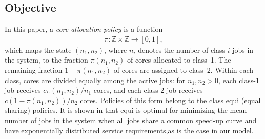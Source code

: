 \documentclass[11pt]{article}
\newcommand{\jp}[1]{\footnote{J-P: #1}}
\theoremstyle{remark}
\theoremstyle{definition}
\numberwithin{equation}{section}
\begin{document}
\subsection{Objective}
In this paper, a {\it core allocation policy} is a function
\begin{align*}
\pi: \mathbb{Z} \times \mathbb{Z} \to [0,1],
\end{align*}
which maps the state $(n_1,n_2)$, where $n_i$ denotes the number of class-$i$ jobs in the system, to the fraction $\pi(n_1,n_2)$ of cores allocated to class~1. The remaining fraction $1-\pi(n_1,n_2)$ of cores are assigned to class~2.
Within each class, cores are divided equally among the active jobs: for $n_1,n_2>0$, each class-1 job receives $c\pi(n_1,n_2)/n_1$ cores, and each class-2 job receives $c(1-\pi(n_1,n_2))/n_2$ cores. Policies of this form belong to the class {\sc equi} (equal sharing) policies.
It is shown in \cite{berg2017} that {\sc equi} is optimal for minimizing the mean number of jobs in the system when all jobs share a common speed-up curve and have exponentially distributed service requirements,{as is the case in our model.}
\end{document}
